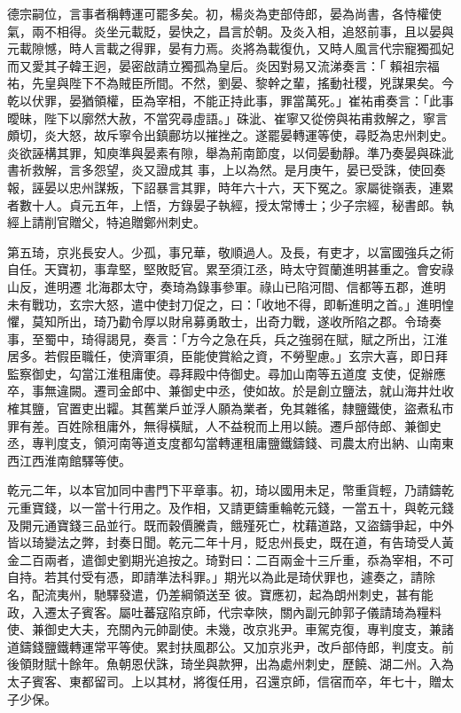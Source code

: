 \begin{pinyinscope}
 德宗嗣位，言事者稱轉運可罷多矣。初，楊炎為吏部侍郎，晏為尚書，各恃權使氣，兩不相得。炎坐元載貶，晏快之，昌言於朝。及炎入相，追怒前事，且以晏與元載隙憾，時人言載之得罪，晏有力焉。炎將為載復仇，又時人風言代宗寵獨孤妃而又愛其子韓王迥，晏密啟請立獨孤為皇后。炎因對易又流涕奏言：「
 賴祖宗福祐，先皇與陛下不為賊臣所間。不然，劉晏、黎幹之輩，搖動社稷，兇謀果矣。今乾以伏罪，晏猶領權，臣為宰相，不能正持此事，罪當萬死。」崔祐甫奏言：「此事曖昧，陛下以廓然大赦，不當究尋虛語。」硃泚、崔寧又從傍與祐甫救解之，寧言頗切，炎大怒，故斥寧令出鎮鄜坊以摧挫之。遂罷晏轉運等使，尋貶為忠州刺史。炎欲誣構其罪，知庾準與晏素有隙，舉為荊南節度，以伺晏動靜。準乃奏晏與硃泚書祈救解，言多怨望，炎又證成其
 事，上以為然。是月庚午，晏已受誅，使回奏報，誣晏以忠州謀叛，下詔暴言其罪，時年六十六，天下冤之。家屬徙嶺表，連累者數十人。貞元五年，上悟，方錄晏子執經，授太常博士；少子宗經，秘書郎。執經上請削官贈父，特追贈鄭州刺史。



 第五琦，京兆長安人。少孤，事兄華，敬順過人。及長，有吏才，以富國強兵之術自任。天寶初，事韋堅，堅敗貶官。累至須江丞，時太守賀蘭進明甚重之。會安祿山反，進明遷
 北海郡太守，奏琦為錄事參軍。祿山已陷河間、信都等五郡，進明未有戰功，玄宗大怒，遣中使封刀促之，曰：「收地不得，即斬進明之首。」進明惶懼，莫知所出，琦乃勸令厚以財帛募勇敢士，出奇力戰，遂收所陷之郡。令琦奏事，至蜀中，琦得謁見，奏言：「方今之急在兵，兵之強弱在賦，賦之所出，江淮居多。若假臣職任，使濟軍須，臣能使賞給之資，不勞聖慮。」玄宗大喜，即日拜監察御史，勾當江淮租庸使。尋拜殿中侍御史。尋加山南等五道度
 支使，促辦應卒，事無違闕。遷司金郎中、兼御史中丞，使如故。於是創立鹽法，就山海井灶收榷其鹽，官置吏出糶。其舊業戶並浮人願為業者，免其雜徭，隸鹽鐵使，盜煮私市罪有差。百姓除租庸外，無得橫賦，人不益稅而上用以饒。遷戶部侍郎、兼御史丞，專判度支，領河南等道支度都勾當轉運租庸鹽鐵鑄錢、司農太府出納、山南東西江西淮南館驛等使。



 乾元二年，以本官加同中書門下平章事。初，琦以國用未足，幣重貨輕，乃請鑄乾
 元重寶錢，以一當十行用之。及作相，又請更鑄重輪乾元錢，一當五十，與乾元錢及開元通寶錢三品並行。既而穀價騰貴，餓殣死亡，枕藉道路，又盜鑄爭起，中外皆以琦變法之弊，封奏日聞。乾元二年十月，貶忠州長史，既在道，有告琦受人黃金二百兩者，遣御史劉期光追按之。琦對曰：二百兩金十三斤重，忝為宰相，不可自持。若其付受有憑，即請準法科罪。」期光以為此是琦伏罪也，遽奏之，請除名，配流夷州，馳驛發遣，仍差綱領送至
 彼。寶應初，起為朗州刺史，甚有能政，入遷太子賓客。屬吐蕃寇陷京師，代宗幸陜，關內副元帥郭子儀請琦為糧料使、兼御史大夫，充關內元帥副使。未幾，改京兆尹。車駕克復，專判度支，兼諸道鑄錢鹽鐵轉運常平等使。累封扶風郡公。又加京兆尹，改戶部侍郎，判度支。前後領財賦十餘年。魚朝恩伏誅，琦坐與款狎，出為處州刺史，歷饒、湖二州。入為太子賓客、東都留司。上以其材，將復任用，召還京師，信宿而卒，年七十，贈太子少保。




\end{pinyinscope}
